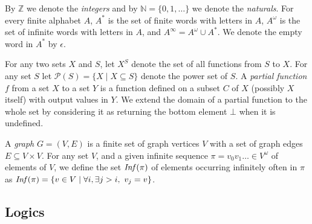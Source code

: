 \documentclass[a4paper,UKenglish,cleveref, autoref, thm-restate]{lipics-v2021}
\newcommand{\Z}{\mathbb{Z}}
\newcommand{\N}{\mathbb{N}}
\begin{document}
By $\Z $ we denote the {\em integers} and by $\N=\{0,1,\ldots\}$ we denote the {\em naturals}.
For every finite alphabet $A$, $A^*$ is the set of finite
words with letters in  $A$, $A^\omega$ is the set of infinite words with letters in $A$, and
 $A^\infty = A^\omega \cup A^*$. We denote the empty word in $A^*$ by $\epsilon$.
%

 For any two sets $X$ and $S$, let $X^S$ denote the set of all functions from $S$ to $X$.
For any set $S$ let 
$\mathcal{P}(S) = \{ X \mid X \subseteq S \}$
denote the power set of $S$.
%
A {\em partial function} $f$ from a set $X$ to a set $Y$ is a function defined on a subset $C$ of $X$ (possibly $X$ itself) with output values in $Y$. We extend the domain of a partial function to the whole set
by considering it as returning the bottom element $\bot$ when it is undefined.




A {\em graph} $G=(V,E)$ is a finite set of graph vertices $V$ with a set of graph edges $E \subseteq V \times V$. 
%
For any set $V$, and a given infinite sequence $\pi = v_0 v_1 \ldots \in V^\omega$ of elements of $V$, we define the set 
$\text{\textit{Inf}}(\pi)$ of elements occurring infinitely often in $\pi$ as
$\text{\textit{Inf}}(\pi) = \{ v \in V \mid \forall i, \exists j > i, ~ v_j = v \}$. 



		\iffalse


\subsection{Logics}
\end{document}

